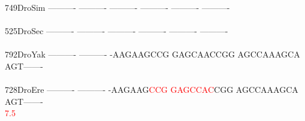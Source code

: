 \documentclass[11pt,twoside,reqno,a4paper]{article}
\begin{document}
{749\hspace*{2\charwidth}DroSim	----------	----------	----------	----------	----------	----------	\\
\hspace*{5\charwidth}\hspace*{7\charwidth}\hspace*{1\charwidth}\hspace*{1\charwidth}\hspace*{1\charwidth}\hspace*{1\charwidth}\hspace*{1\charwidth}\hspace*{1\charwidth}\\
525\hspace*{2\charwidth}DroSec	----------	----------	----------	----------	----------	----------	\\
\hspace*{5\charwidth}\hspace*{7\charwidth}\hspace*{1\charwidth}\hspace*{1\charwidth}\hspace*{1\charwidth}\hspace*{1\charwidth}\hspace*{1\charwidth}\hspace*{1\charwidth}\\
792\hspace*{2\charwidth}DroYak	----------	----------	-AAGAAGCCG	GAGCAACCGG	AGCCAAAGCA	AGT-------	\\
\hspace*{5\charwidth}\hspace*{7\charwidth}\hspace*{1\charwidth}\hspace*{1\charwidth}\hspace*{1\charwidth}\hspace*{1\charwidth}\hspace*{1\charwidth}\hspace*{1\charwidth}\\
728\hspace*{2\charwidth}DroEre	----------	----------	-AAGAAG\textcolor{red}{C}\textcolor{red}{C}\textcolor{red}{G}	\textcolor{red}{G}\textcolor{red}{A}\textcolor{red}{G}\textcolor{red}{C}\textcolor{red}{C}\textcolor{red}{A}\textcolor{red}{C}CGG	AGCCAAAGCA	AGT-------	\\
\hspace*{5\charwidth}\hspace*{7\charwidth}\hspace*{1\charwidth}\hspace*{1\charwidth}\hspace*{27\charwidth}\textcolor{red}{7.5}\hspace*{1\charwidth}\hspace*{1\charwidth}\hspace*{1\charwidth}\hspace*{1\charwidth}\\
}
\end{document}
